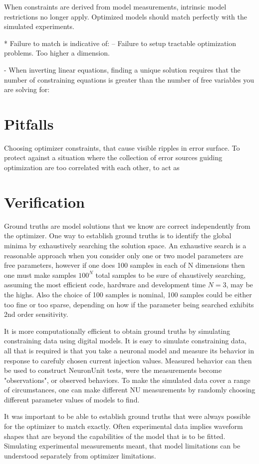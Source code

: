 When constraints are derived from model measurements, intrinsic model restrictions no longer apply. Optimized models should match perfectly with the simulated experiments. 

* Failure to match is indicative of: -- Failure to setup tractable optimization problems. Too higher a dimension.

- When inverting linear equations, finding a unique solution requires that the number of constraining equations is greater than the number of free variables you are solving for:

\section{Pitfalls}
Choosing optimizer constraints, that cause visible ripples in error surface.
To protect against a situation where the collection of error sources guiding optimization are too correlated with each other, to act as 


\section{Verification}
Ground truths are model solutions that we know are correct independently from the optimizer. One way to establish ground truths is to identify the global minima by exhaustively searching the solution space. An exhaustive search is a reasonable approach when you consider only one or two model parameters are free parameters, however if one does 100 samples in each of N dimensions then one must make samples $100^{N}$ total samples to be sure of ehaustively searching, assuming the most efficient code, hardware and development time $N=3$, may be the highs.  Also the choice of 100 samples is nominal, 100 samples could be either too fine or too sparse, depending on how if the parameter being searched exhibits 2nd order sensitivity.

It is more computationally efficient to obtain ground truths by simulating constraining data using digital models. It is easy to simulate constraining data, all that is required is that you take a neuronal model and measure its behavior in response to carefuly chosen current injection values. Measured behavior can then be used to construct NeuronUnit tests, were the measurements become "observations", or observed behaviors. To make the simulated data cover a range of circumstances, one can make different NU measurements by randomly choosing different parameter values of models to find.

It was important to be able to establish ground truths that were always possible for the optimizer to match exactly. Often experimental data implies waveform shapes that are beyond the capabilities of the model that is to be fitted. Simulating experimental measurements meant, that model limitations can be understood separately from optimizer limitations.

